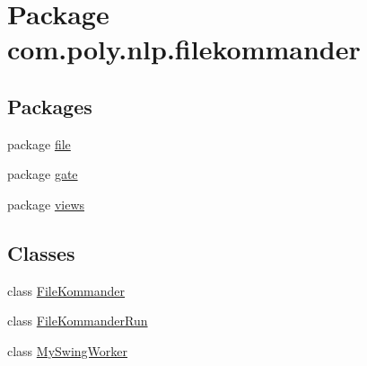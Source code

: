 \hypertarget{namespacecom_1_1poly_1_1nlp_1_1filekommander}{\section{Package com.\-poly.\-nlp.\-filekommander}
\label{namespacecom_1_1poly_1_1nlp_1_1filekommander}
}
\subsection*{Packages}
\begin{DoxyCompactItemize}
\item 
package \hyperlink{namespacecom_1_1poly_1_1nlp_1_1filekommander_1_1file}{file}
\item 
package \hyperlink{namespacecom_1_1poly_1_1nlp_1_1filekommander_1_1gate}{gate}
\item 
package \hyperlink{namespacecom_1_1poly_1_1nlp_1_1filekommander_1_1views}{views}
\end{DoxyCompactItemize}
\subsection*{Classes}
\begin{DoxyCompactItemize}
\item 
class \hyperlink{classcom_1_1poly_1_1nlp_1_1filekommander_1_1_file_kommander}{File\-Kommander}
\item 
class \hyperlink{classcom_1_1poly_1_1nlp_1_1filekommander_1_1_file_kommander_run}{File\-Kommander\-Run}
\item 
class \hyperlink{classcom_1_1poly_1_1nlp_1_1filekommander_1_1_my_swing_worker}{My\-Swing\-Worker}
\end{DoxyCompactItemize}
